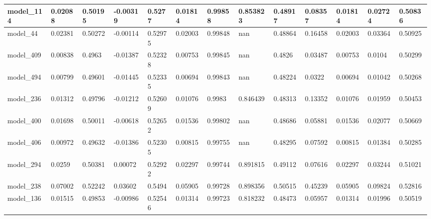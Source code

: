 \begin{tabular}{|l|l|l|l|l|l|l|l|l|l|l|l|l|}
model\_114     & 0.02088     & 0.50195        & -0.00319     & 0.5277           & 0.01814              & 0.99858              & 0.853823     & 0.48917           & 0.08357            & 0.01814         & 0.02724     & 0.50836      \\ \hline
model\_44      & 0.02381     & 0.50272        & -0.00114     & 0.52975          & 0.02003              & 0.99848              & nan          & 0.48864           & 0.16458            & 0.02003         & 0.03364     & 0.50925      \\ \hline
model\_409     & 0.00838     & 0.4963         & -0.01387     & 0.52328          & 0.00753              & 0.99845              & nan          & 0.4826            & 0.03487            & 0.00753         & 0.0104      & 0.50299      \\ \hline
model\_494     & 0.00799     & 0.49601        & -0.01445     & 0.52335          & 0.00694              & 0.99843              & nan          & 0.48224           & 0.0322             & 0.00694         & 0.01042     & 0.50268      \\ \hline
model\_236     & 0.01312     & 0.49796        & -0.01212     & 0.52609          & 0.01076              & 0.9983               & 0.846439     & 0.48313           & 0.13352            & 0.01076         & 0.01959     & 0.50453      \\ \hline
model\_400     & 0.01698     & 0.50011        & -0.00618     & 0.52652          & 0.01536              & 0.99802              & nan          & 0.48686           & 0.05881            & 0.01536         & 0.02077     & 0.50669      \\ \hline
model\_406     & 0.00972     & 0.49632        & -0.01386     & 0.52305          & 0.00815              & 0.99755              & nan          & 0.48295           & 0.07592            & 0.00815         & 0.01384     & 0.50285      \\ \hline
model\_294     & 0.0259      & 0.50381        & 0.00072      & 0.52922          & 0.02297              & 0.99744              & 0.891815     & 0.49112           & 0.07616            & 0.02297         & 0.03244     & 0.51021      \\ \hline
model\_238     & 0.07002     & 0.52242        & 0.03602      & 0.5494           & 0.05905              & 0.99728              & 0.898356     & 0.50515           & 0.45239            & 0.05905         & 0.09824     & 0.52816      \\ \hline
model\_136     & 0.01515     & 0.49853        & -0.00986     & 0.52546          & 0.01314              & 0.99723              & 0.818232     & 0.48473           & 0.05957            & 0.01314         & 0.01996     & 0.50519      \\ \hline

\end{tabular}
